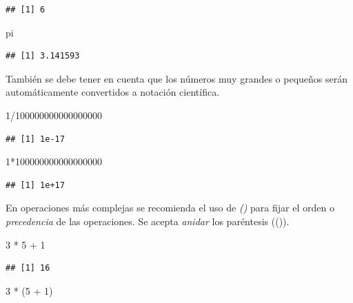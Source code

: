 \documentclass[
]{book}
\newenvironment{Shaded}{\begin{snugshade}}{\end{snugshade}}
\newcommand{\DecValTok}[1]{\textcolor[rgb]{0.00,0.00,0.81}{#1}}
\newcommand{\NormalTok}[1]{#1}
\newcommand{\SpecialCharTok}[1]{\textcolor[rgb]{0.00,0.00,0.00}{#1}}
\begin{document}
\begin{verbatim}
## [1] 6
\end{verbatim}

\begin{Shaded}
\begin{Highlighting}[]
\NormalTok{pi}
\end{Highlighting}
\end{Shaded}

\begin{verbatim}
## [1] 3.141593
\end{verbatim}

También se debe tener en cuenta que los números muy grandes o pequeños serán automáticamente convertidos a notación científica.

\begin{Shaded}
\begin{Highlighting}[]
\DecValTok{1}\SpecialCharTok{/}\DecValTok{100000000000000000}
\end{Highlighting}
\end{Shaded}

\begin{verbatim}
## [1] 1e-17
\end{verbatim}

\begin{Shaded}
\begin{Highlighting}[]
\DecValTok{1}\SpecialCharTok{*}\DecValTok{100000000000000000}
\end{Highlighting}
\end{Shaded}

\begin{verbatim}
## [1] 1e+17
\end{verbatim}

En operaciones más complejas se recomienda el uso de \emph{()} para fijar el orden o \emph{precedencia} de las operaciones. Se acepta \emph{anidar} los paréntesis (()).

\begin{Shaded}
\begin{Highlighting}[]
\DecValTok{3} \SpecialCharTok{*} \DecValTok{5} \SpecialCharTok{+} \DecValTok{1}
\end{Highlighting}
\end{Shaded}

\begin{verbatim}
## [1] 16
\end{verbatim}

\begin{Shaded}
\begin{Highlighting}[]
\DecValTok{3} \SpecialCharTok{*}\NormalTok{ (}\DecValTok{5} \SpecialCharTok{+} \DecValTok{1}\NormalTok{)}
\end{Highlighting}
\end{Shaded}
\end{document}
